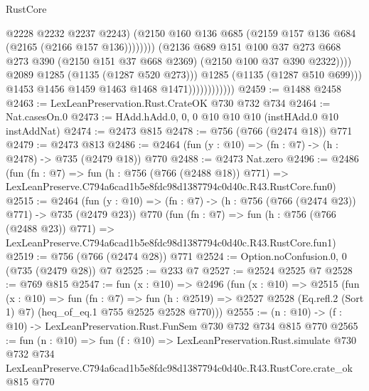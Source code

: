 \begin{lexlean}{RustCore}
\begin{coremodule}
                                              @2228
                                              @2232
                                              @2237
                                              @2243)
                                            (@2150
                                              @160
                                              @136
                                              @685
                                              (@2159 @157 @136 @684 (@2165 (@2166 @157 @136))))))))
                                    (@2136
                                      @689
                                      @151
                                      @100
                                      @37
                                      @273
                                      @668
                                      @273
                                      @390
                                      (@2150 @151 @37 @668 @2369)
                                      (@2150 @100 @37 @390 @2322))))
                                @2089
                                @1285
                                (@1135 (@1287 @520 @273)))
                              @1285
                              (@1135 (@1287 @510 @699)))
                            @1453
                            @1456
                            @1459
                            @1463
                            @1468
                            @1471))))))))))))
@2459 := @1488 @2458
@2463 := LexLeanPreservation.Rust.CrateOK @730 @732 @734
@2464 := Nat.casesOn.{0}
@2473 := HAdd.hAdd.{0, 0, 0} @10 @10 @10 (instHAdd.{0} @10 instAddNat)
@2474 := @2473 @815
@2478 := @756 (@766 (@2474 @18)) @771
@2479 := @2473 @813
@2486 := @2464 (fun (y : @10) => (fn : @7) -> (h : @2478) -> @735 (@2479 @18)) @770
@2488 := @2473 Nat.zero
@2496 := @2486
    (fun (fn : @7) =>
    fun (h : @756 (@766 (@2488 @18)) @771) =>
    LexLeanPreserve.C794a6cad1b5e8fdc98d1387794c0d40c.R43.RustCore.fun0)
@2515 := @2464
    (fun (y : @10) => (fn : @7) -> (h : @756 (@766 (@2474 @23)) @771) -> @735 (@2479 @23))
    @770
    (fun (fn : @7) =>
    fun (h : @756 (@766 (@2488 @23)) @771) =>
    LexLeanPreserve.C794a6cad1b5e8fdc98d1387794c0d40c.R43.RustCore.fun1)
@2519 := @756 (@766 (@2474 @28)) @771
@2524 := Option.noConfusion.{0, 0} (@735 (@2479 @28)) @7
@2525 := @233 @7
@2527 := @2524 @2525 @7
@2528 := @769 @815
@2547 := fun (x : @10) =>
  @2496
    (fun (x : @10) =>
    @2515
      (fun (x : @10) =>
      fun (fn : @7) =>
      fun (h : @2519) =>
      @2527 @2528 (Eq.refl.{2} (Sort 1) @7) (heq_of_eq.{1} @755 @2525 @2528 @770)))
@2555 := (n : @10) -> (f : @10) -> LexLeanPreservation.Rust.FunSem @730 @732 @734 @815 @770
@2565 := fun (n : @10) =>
  fun (f : @10) =>
  LexLeanPreservation.Rust.simulate
    @730
    @732
    @734
    LexLeanPreserve.C794a6cad1b5e8fdc98d1387794c0d40c.R43.RustCore.crate_ok
    @815
    @770
\end{coremodule}
\end{lexlean}
